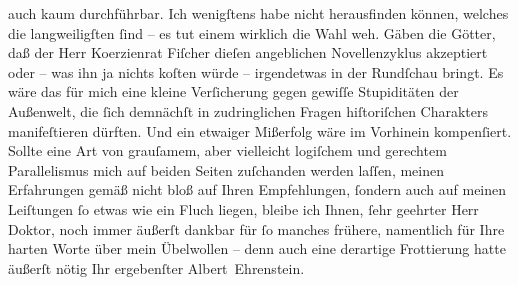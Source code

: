 \begin{ledgroupsized}[t]{13cm}
               auch kaum durchführbar. Ich wenigſtens habe nicht herausfinden können, welches die
               langweiligſten ſind – es tut einem wirklich die Wahl weh. Gäben die Götter, daß der
               Herr Ko{\geminationm}erzienrat Fiſcher dieſen angeblichen Novellenzyklus akzeptiert oder – was ihn ja
               nichts koſten würde – irgendetwas in der Rundſchau bringt. Es wäre das für mich eine kleine Verſicherung gegen
               gewiſſe Stupiditäten der Außenwelt, die ſich demnächſt in zudringlichen Fragen
               hiſtoriſchen Charakters manifeſtieren dürften.\pend
           \pstart
           {\pb}Und ein etwaiger Mißerfolg wäre im
               Vorhinein kompenſiert.\pend
           \pstart
           Sollte eine Art von grauſamem, aber vielleicht logiſchem und gerechtem Parallelismus
               mich auf beiden Seiten zuſchanden werden laſſen, meinen Erfahrungen gemäß nicht bloß
               auf Ihren Empfehlungen, ſondern auch auf meinen Leiſtungen ſo etwas wie ein Fluch
               liegen, bleibe ich Ihnen, ſehr geehrter Herr Doktor, noch immer äußerſt dankbar für
               ſo manches frühere, namentlich für Ihre harten Worte über mein Übelwollen – denn auch
               eine derartige Frottierung hatte äußerſt nötig Ihr ergebenſter\pend
           \pstart \spacefill\mbox{Albert Ehrenstein.}\pend{}
         
         \endnumbering{}\end{ledgroupsized}  \newcommand{\dateiname}{L01884}\newcommand{\titel}{Albert Ehrenstein an Arthur Schnitzler, 6. 11. 1909}\newcommand{\editorInnen}{Martin Anton Müller und Gerd-Hermann Susen}
      